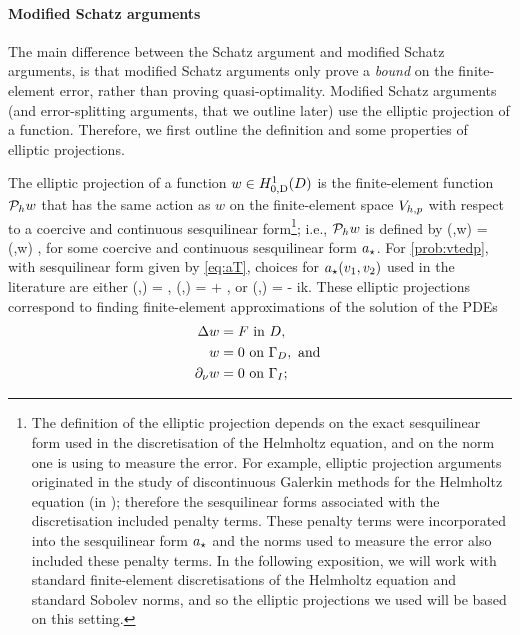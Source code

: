 \paragraph{Modified Schatz arguments} The main difference between the Schatz argument and modified Schatz arguments, is that modified Schatz arguments only prove a \emph{bound} on the finite-element error, rather than proving quasi-optimality. Modified Schatz arguments (and error-splitting arguments, that we outline later) use the elliptic projection of a function. Therefore, we first outline the definition and some properties of elliptic projections.



The elliptic projection of a function $ w \in \HozDD$ is the finite-element function $\mathcal P_{h} w$ that has the same action as $w$ on the finite-element space $V_{h,p}$ with respect to a coercive and continuous sesquilinear form\footnote{The definition of the elliptic projection depends on the exact sesquilinear form used in the discretisation of the Helmholtz equation, and on the norm one is using to measure the error. For example, elliptic projection arguments originated in the study of discontinuous Galerkin methods for the Helmholtz equation (in \cite{FeWu:09,FeWu:11}); therefore the sesquilinear forms associated with the discretisation included penalty terms. These penalty terms were incorporated into the sesquilinear form $a_{\star}$ and the norms used to measure the error also included these penalty terms. In the following exposition, we will work with standard finite-element discretisations of the Helmholtz equation and standard Sobolev norms, and so the elliptic projections we used will be based on this setting.}; i.e., $\mathcal P_{h} w$ is defined by
\beqs
\aep(\vh,\Ph w) = \aep(\vh,w) \tforall \vh \in \Vhp,
\eeqs
for some coercive and continuous sesquilinear form $a_{\star}$. For \cref{prob:vtedp}, with sesquilinear form given by \cref{eq:aT}, choices for $a_{\star}(v_{1},v_{2})$ used in the literature are either
\beq\label{eq:aepho}
\aep(\vo,\vt) = \IPLtD{\grad \vo}{\grad \vt},
\eeq
\beq\label{eq:aeplower}
\aep(\vo,\vt) = \IPLtD{\grad \vo}{\grad \vt} + \IPLtD{\vo}{\vt},
\eeq
or
\beq\label{eq:aepused}
\aep(\vo,\vt) = \IPLtD{\grad \vo}{\grad \vt} - ik\IPLtGI{\vo}{\vt}.
\eeq
These elliptic projections correspond to finding finite-element approximations of the solution of the PDEs
\begin{subequations}
  \label{eq:sda}
\begin{align}
  \Delta w &= F \text{ in } D,\label{eq:sd1}\\
  w &= 0 \text{ on } \Gamma_{D},\text{ and }\label{eq:sd2}\\
  \partial_{\nu} w &= 0 \text{ on } \Gamma_{I}\label{eq:sd3};
\end{align}
\end{subequations}
